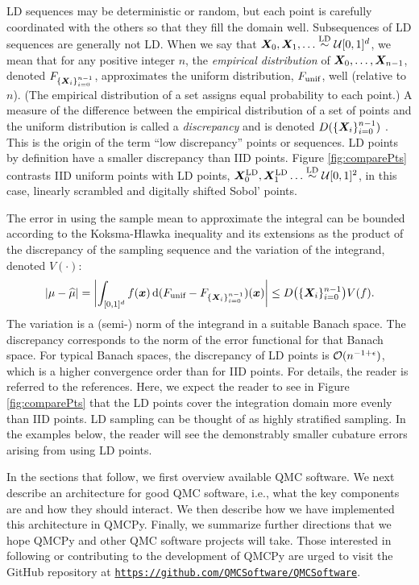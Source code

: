 \documentclass[graybox,footinfo]{svmult}
\newcommand{\QMCPYabs}[1]{\ensuremath{{\left \lvert #1 \right \rvert}}}
\newcommand{\QMCPYbiggabs}[1]{\ensuremath{{\biggl \lvert #1 \biggr \rvert}}}
\newcommand{\hmu}{\widehat{\mu}}
\newcommand{\LD}{\textup{LD}}
\newcommand{\unif}{\textup{unif}}
\newcommand{\LDsim}{\overset{\LD}{\sim}}
\newcommand{\cube}{[0,1]^d}
\begin{document}
LD sequences may be deterministic or random, but each point is carefully coordinated with the others so that they fill the domain well.  Subsequences of LD sequences are generally not LD.  When we say that $\bsX_0, \bsX_1, \ldots \LDsim \calU\cube$, we mean that for any positive integer $n$,  the \emph{empirical distribution} of ${\boldsymbol{X}}_0, \ldots, {\boldsymbol{X}}_{n-1}$, denoted $F_{\{{\boldsymbol{X}}_i\}_{i=0}^{n-1}}$,  approximates the uniform distribution, $F_\unif$, well (relative to $n$).  (The empirical distribution of a set assigns equal probability to each point.)  A measure of the difference between the empirical distribution of a set of points and the uniform distribution is called a \emph{discrepancy} and is denoted $D(\{{\boldsymbol{X}}_i\}_{i=0}^{n-1})$ \cite{DicEtal14a,Hic97a,Hic99a,Nie92}.  This is the origin of the term ``low discrepancy'' points or sequences.  LD points by definition have a smaller discrepancy than IID points.  Figure \ref{fig:comparePts} contrasts IID uniform points with LD points, $\bsX^{\LD}_0, \bsX^{\LD}_1 \ldots \LDsim \calU[0,1]^2$, in this case, linearly scrambled and digitally shifted Sobol' points.

The error in using the sample mean to approximate the integral can be bounded according to the Koksma-Hlawka inequality and its extensions \cite{DicEtal14a,Hic97a,Hic99a,Nie92} as the product of the discrepancy of the sampling sequence and the variation of the integrand, denoted $V(\cdot)$:
\begin{equation}
	\QMCPYabs{\mu - \hmu} = \QMCPYbiggabs{\int_{\cube} f(\bsx) \, \D (F_\unif - F_{\{\bsX_i\}_{i=0}^{n-1}}) (\bsx)} \le D\bigl(\{\bsX_i\}_{i=0}^{n-1}\bigr) V(f).
\end{equation} 
The variation is a (semi-) norm of the integrand in a suitable Banach space.  The discrepancy corresponds to the norm of the error functional for that Banach space.  For typical Banach spaces, the discrepancy of LD points is ${\mathcal{O}}(n^{-1+\epsilon})$, which is a higher convergence order than for IID points.  For details, the reader is referred to the references.  Here, we expect the reader to see in Figure \ref{fig:comparePts} that the LD points cover the integration domain more evenly than IID points.  LD sampling can be thought of as highly stratified sampling.  In the examples below, the reader will see the demonstrably smaller cubature errors arising from using LD points.

In the sections that follow, we first overview available QMC software.  We next describe an architecture for good QMC software, i.e., what the key components are and how they should interact.  We then describe how we have implemented this architecture in QMCPy.  Finally, we summarize further directions that we hope QMCPy and other QMC software projects will take.  Those interested in following or contributing to the development of QMCPy are urged to visit the GitHub repository at \href{https://github.com/QMCSoftware/QMCSoftware}{\nolinkurl{https://github.com/QMCSoftware/QMCSoftware}}.
\end{document}
